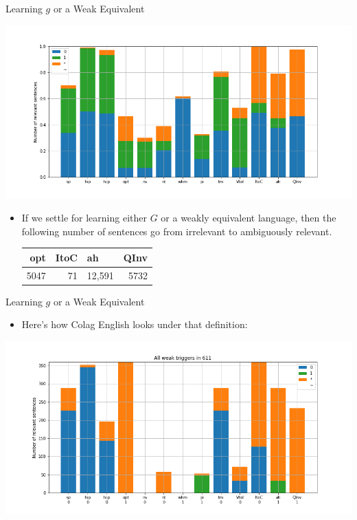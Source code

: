 \documentclass[presentation]{beamer}
\begin{document}
\begin{frame}[label={sec:orgdb06441}]{Learning \(g\) or a Weak Equivalent}
\begin{center}
\includegraphics[width=.9\linewidth]{./images/all-triggers-weak-equiv.png}
\end{center}

\begin{itemize}
\item If we settle for learning either \(G\) or a weakly equivalent language, then
the following number of sentences go from irrelevant to ambiguously
relevant.
\begin{center}
\begin{tabular}{rrlr}
opt & ItoC & ah & QInv\\
\hline
5047 & 71 & 12,591 & 5732\\
\end{tabular}
\end{center}
\end{itemize}
\end{frame}
\begin{frame}[label={sec:orgff0c87a}]{Learning \(g\) or a Weak Equivalent}
\begin{itemize}
\item Here's how Colag English looks under that definition:
\end{itemize}

\begin{center}
\includegraphics[width=.9\linewidth]{./images/english-triggers-weak-equiv.png}
\end{center}
\end{frame}
\end{document}
